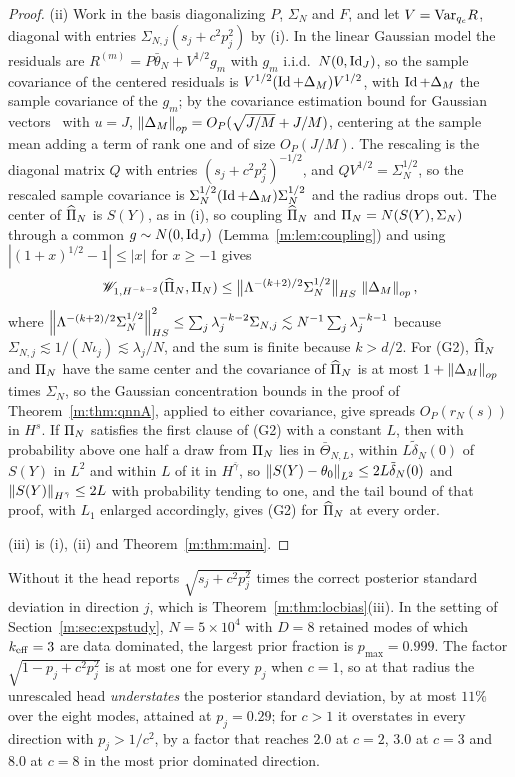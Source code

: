 \begin{proof}
(ii) Work in the basis diagonalizing $P$, $\Sigma_N$ and $F$, and let $V=\mathrm{Var}_{q_c}R$, diagonal with entries $\Sigma_{N,j}(s_j+c^2p_j^2)$ by (i). In the linear Gaussian model the residuals are $R^{(m)}=P\bar\theta_N+V^{1/2}g_m$ with $g_m$ i.i.d.\ $N(0,\operatorname{Id}_J)$, so the sample covariance of the centered residuals is $V^{1/2}(\operatorname{Id}+\Delta_M)V^{1/2}$, with $\operatorname{Id}+\Delta_M$ the sample covariance of the $g_m$; by the covariance estimation bound for Gaussian vectors~\cite[Theorem 4.7.1 and Exercise 4.7.3]{vershynin2018} with $u=J$, $\left\|\Delta_M\right\|_{op}=O_P(\sqrt{J/M}+J/M)$, centering at the sample mean adding a term of rank one and of size $O_P(J/M)$. The rescaling is the diagonal matrix $Q$ with entries $(s_j+c^2p_j^2)^{-1/2}$, and $QV^{1/2}=\Sigma_N^{1/2}$, so the rescaled sample covariance is $\Sigma_N^{1/2}(\operatorname{Id}+\Delta_M)\Sigma_N^{1/2}$ and the radius drops out. The center of $\widehat\Pi_N$ is $S(Y)$, as in (i), so coupling $\widehat\Pi_N$ and $\Pi_N=N(S(Y),\Sigma_N)$ through a common $g\sim N(0,\operatorname{Id}_J)$ (Lemma~\ref{m:lem:coupling}) and using $|(1+x)^{1/2}-1|\le|x|$ for $x\ge-1$ gives
\[
\mathscr{W}_{1,H^{-k-2}}(\widehat\Pi_N,\Pi_N)\le\big\|\Lambda^{-(k+2)/2}\Sigma_N^{1/2}\big\|_{HS}\,\left\|\Delta_M\right\|_{op},
\]
where $\left\|\Lambda^{-(k+2)/2}\Sigma_N^{1/2}\right\|^2_{HS}\le\sum_j\lambda_j^{-k-2}\Sigma_{N,j}\lesssim N^{-1}\sum_j\lambda_j^{-k-1}$ because $\Sigma_{N,j}\lesssim1/(N\iota_j)\lesssim\lambda_j/N$, and the sum is finite because $k>d/2$. For (G2), $\widehat\Pi_N$ and $\Pi_N$ have the same center and the covariance of $\widehat\Pi_N$ is at most $1+\left\|\Delta_M\right\|_{op}$ times $\Sigma_N$, so the Gaussian concentration bounds in the proof of Theorem~\ref{m:thm:qnnA}, applied to either covariance, give spreads $O_P(r_N(s))$ in $H^s$. If $\Pi_N$ satisfies the first clause of (G2) with a constant $L$, then with probability above one half a draw from $\Pi_N$ lies in $\bar\Theta_{N,L}$, within $L\tilde\delta_N(0)$ of $S(Y)$ in $L^2$ and within $L$ of it in $H^{\bar\gamma}$, so $\left\|S(Y)-\theta_0\right\|_{L^2}\le2L\tilde\delta_N(0)$ and $\left\|S(Y)\right\|_{H^{\bar\gamma}}\le2L$ with probability tending to one, and the tail bound of that proof, with $L_1$ enlarged accordingly, gives (G2) for $\widehat\Pi_N$ at every order.

(iii) is (i), (ii) and Theorem~\ref{m:thm:main}.
\end{proof}

\begin{remark}\label{m:rem:rescale}
Without it the head reports $\sqrt{s_j+c^2p_j^2}$ times the correct posterior standard deviation in direction $j$, which is Theorem~\ref{m:thm:locbias}(iii). In the setting of Section~\ref{m:sec:expstudy}, $N=5\times10^4$ with $D=8$ retained modes of which $k_{\rm eff}=3$ are data dominated, the largest prior fraction is $p_{\max}=0.999$. The factor $\sqrt{1-p_j+c^2p_j^2}$ is at most one for every $p_j$ when $c=1$, so at that radius the unrescaled head \emph{understates} the posterior standard deviation, by at most $11\%$ over the eight modes, attained at $p_j=0.29$; for $c>1$ it overstates in every direction with $p_j>1/c^2$, by a factor that reaches $2.0$ at $c=2$, $3.0$ at $c=3$ and $8.0$ at $c=8$ in the most prior dominated direction.
\end{remark}

